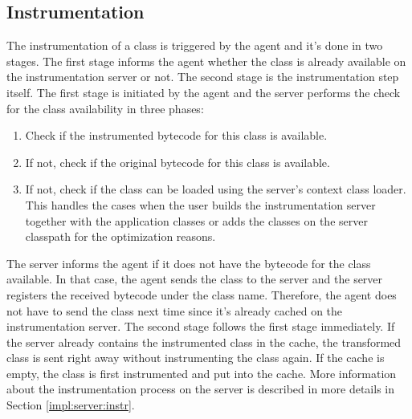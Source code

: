 \subsection{Instrumentation}
The instrumentation of a class is triggered by the agent and it's done in two stages. The first stage informs the agent whether the class is already available on the instrumentation server or not. The second stage is the instrumentation step itself. The first stage is initiated by the agent and the server performs the check for the class availability in three phases:
\begin{enumerate}
	\item Check if the instrumented bytecode for this class is available.
	\item If not, check if the original bytecode for this class is available.
	\item If not, check if the class can be loaded using the server's context class loader. This handles the cases when the user builds the instrumentation server together with the application classes or adds the classes on the server classpath for the optimization reasons.
\end{enumerate}

The server informs the agent if it does not have the bytecode for the class available. In that case, the agent sends the class to the server and the server registers the received bytecode under the class name. Therefore, the agent does not have to send the class next time since it's already cached on the instrumentation server. The second stage follows the first stage immediately. If the server already contains the instrumented class in the cache, the transformed class is sent right away without instrumenting the class again. If the cache is empty, the class is first instrumented and put into the cache. More information about the instrumentation process on the server is described in more details in Section \ref{impl:server:instr}.

